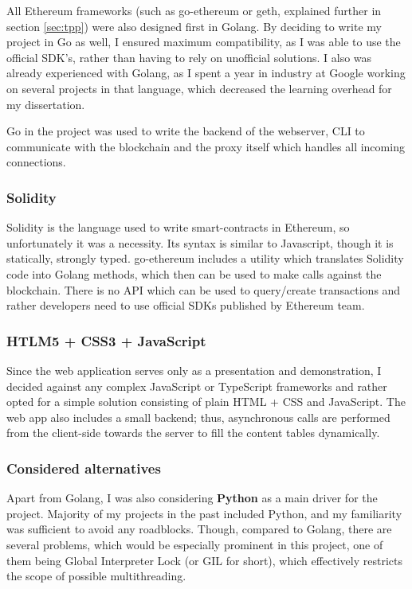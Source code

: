All Ethereum frameworks (such as go-ethereum or geth, explained further in section \ref{sec:tpp}) were also designed first in Golang. By deciding to write my project in Go as well, I ensured maximum compatibility, as I was able to use the official SDK's, rather than having to rely on unofficial solutions. I also was already experienced with Golang, as I spent a year in industry at Google working on several projects in that language, which decreased the learning overhead for my dissertation.

Go in the project was used to write the backend of the webserver, CLI to communicate with the blockchain and the proxy itself which handles all incoming connections.
\subsubsection{Solidity}
Solidity \cite{dannen2017introducing} is the language used to write smart-contracts in Ethereum, so unfortunately it was a necessity. Its syntax is similar to Javascript, though it is statically, strongly typed. go-ethereum includes a utility which translates Solidity code into Golang methods, which then can be used to make calls against the blockchain. There is no API which can be used to query/create transactions and rather developers need to use official SDKs published by Ethereum team.
\subsubsection{HTLM5 + CSS3 + JavaScript}
Since the web application serves only as a presentation and demonstration, I decided against any complex JavaScript or TypeScript frameworks and rather opted for a simple solution consisting of plain HTML + CSS and JavaScript. The web app also includes a small backend; thus, asynchronous calls are performed from the client-side towards the server to fill the content tables dynamically.
\subsubsection{Considered alternatives}
Apart from Golang, I was also considering \textbf{Python} as a main driver for the project. Majority of my projects in the past included Python, and my familiarity was sufficient to avoid any roadblocks. Though, compared to Golang, there are several problems, which would be especially prominent in this project, one of them being Global Interpreter Lock\cite{beazley2010understanding} (or GIL for short), which effectively restricts the scope of possible multithreading.

